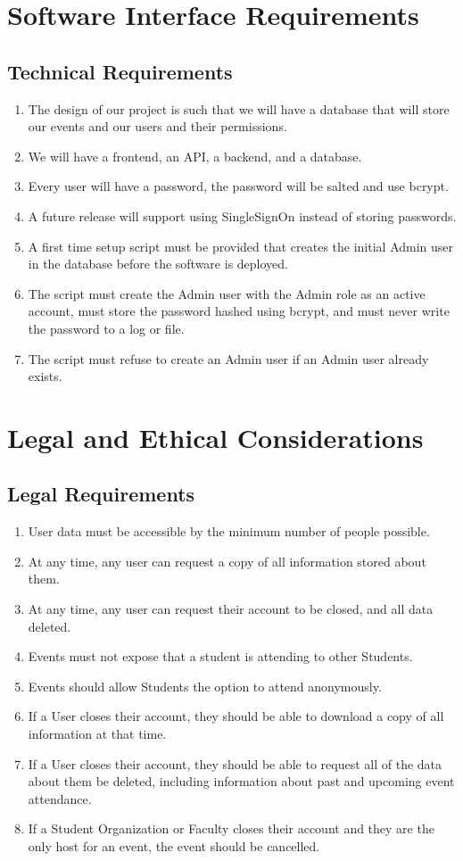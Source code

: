 \newpage %
\section{Software Interface Requirements}
	\subsection{Technical Requirements}
		\begin{enumerate}[leftmargin=3\parindent]
			\item The design of our project is such that we will have a database that will store our events and our users and their permissions.
			\item We will have a frontend, an API, a backend, and a database.
			\item Every user will have a password, the password will be salted and use bcrypt.
			\item A future release will support using SingleSignOn instead of storing passwords.
			\item A first time setup script must be provided that creates the initial Admin user in the database before the software is deployed.
			\item The script must create the Admin user with the Admin role as an active account, must store the password hashed using bcrypt, and must never write the password to a log or file.
			\item The script must refuse to create an Admin user if an Admin user already exists.
		\end{enumerate}

\newpage %
\section{Legal and Ethical Considerations}
	\subsection{Legal Requirements}
		\begin{enumerate}[leftmargin=3\parindent]
			\item User data must be accessible by the minimum number of people possible.
			\item At any time, any user can request a copy of all information stored about them.
			\item At any time, any user can request their account to be closed, and all data deleted.
			\item Events must not expose that a student is attending to other Students.
			\item Events should allow Students the option to attend anonymously.
			\item If a User closes their account, they should be able to download a copy of all information at that time.
			\item If a User closes their account, they should be able to request all of the data about them be deleted, including information about past and upcoming event attendance.
			\item If a Student Organization or Faculty closes their account and they are the only host for an event, the event should be cancelled.
		\end{enumerate}
